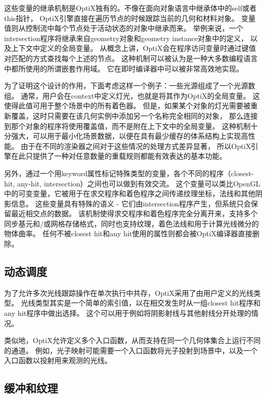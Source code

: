这些变量的继承机制是OptiX独有的。不像在面向对象语言中继承体中的self或者this指针，
OptiX引擎直接在遍历节点的时候跟踪当前的几何和材料对象。
变量值则从控制流中每个节点处于活动状态的对象中继承而来。
举例来说，一个intersection程序将继承来自geometry对象和geometry instance对象中的定义，
以及上下文中定义的全局变量。
从概念上讲，OptiX会在程序访问变量时通过键值对匹配的方式查找每个上述的节点。
这种机制可以被认为是一种大多数编程语言中都所使用的所谓嵌套作用域。
它在即时编译器中可以被非常高效地实现。

为了证明这个设计的作用，下面考虑这样一个例子：一些光源组成了一个光源数组。
通常，用户会在context中定义灯光，也就是将其作为OptiX的全局变量。
这使得此值可用于整个场景中的所有着色器。
但是，如果某个对象的灯光需要被重新覆盖，这时只需要在该几何实例中添加另一个名称完全相同的对象，
那么连接到那个对象的程序将使用覆盖值，而不是附在上下文中的全局变量。
这种机制十分强大，可以用于最小化场景数据，以便在具有最少缓存的体系结构上实现高性能。
由于在不同的渲染器之间对于这些情况的处理方式差异显著，
所以OptiX引擎在此只提供了一种对任意数量的重载规则都能有效表达的基本功能。

另外，通过一个用keyword属性标记特殊类型的变量，各个不同的程序（closest-hit, any-hit, intersection）之间也可以做到有效交流。
这个变量可以类比OpenGL中的可变变量，它被用于在求交程序和着色程序之间传递纹理坐标，法线和其他阴影信息。
这些变量具有特殊的语义 - 它们由intersection程序产生，但系统只会保留最近相交点的数据。
该机制使得求交程序和着色程序完全分离开来，支持多个同步基元和/或网格存储格式，同时也支持纹理，着色法线和用于计算光线微分的物体曲率。
任何不被closest hit和any hit使用的属性则都会被OptiX编译器直接删除。

\subsection{动态调度}

为了允许多次光线跟踪操作在单次执行中共存，OptiX采用了由用户定义的光线类型。
光线类型其实是一个简单的索引值，以在相交发生时从一组closest hit程序和any hit程序中做出选择。
这个可以用于例如将阴影射线与其他射线分开处理的情况。

类似地，OptiX允许定义多个入口函数，从而支持在同一个几何体集合上运行不同的通道。
例如，光子映射可能需要一个入口函数将光子投射到场景中，以及一个入口函数以投射用来观测的光线。

\subsection{缓冲和纹理}

